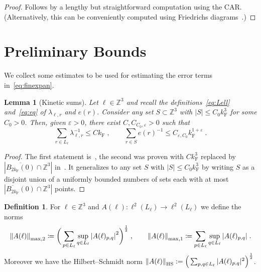 \documentclass[12pt,a4paper]{article}
\numberwithin{equation}{section}
\newcommand{\1}{\mathbb{I}}
\newcommand{\F}{\mathrm{F}}
\newcommand{\HS}{\mathrm{HS}}
\newcommand{\kF}{k_\F}
\newcommand{\Zstar}{\mathbb{Z}^3} %
\newcommand{\Z}{\mathbb{Z}}
\newcommand{\half}{\frac{1}{2}}
\theoremstyle{plain}
\newtheorem{lemma}[theorem]{Lemma}
\theoremstyle{definition}
\newtheorem{definition}[theorem]{Definition}
\theoremstyle{remark}
\theoremstyle{plain}
\theoremstyle{definition}
\theoremstyle{remark}
\begin{document}
\begin{proof}
Follows by a lengthy but straightforward computation using the CAR. (Alternatively, this can be conveniently computed using Friedrichs diagrams~\cite{BL25}.)
\end{proof}


\section{Preliminary Bounds}
\label{sec:prelim_bounds}

We collect some estimates to be used for estimating the error terms in~\eqref{eq:finexpan}.

\begin{lemma}[Kinetic sums] \label{lem:lambdainverse}
Let $ \ell \in \Zstar $ and recall the definitions~\eqref{eq:Lell} and~\eqref{eq:eq} of $ \lambda_{\ell,r} $ and $ e(r) $. Consider any set $ S \subset \Z^3 $ with $ |S| \le C_0 \kF^3 $ for some $ C_0 > 0 $. Then, given $ \varepsilon > 0 $, there exist $ C, C_{C_0, \varepsilon} > 0 $ such that
\begin{equation} \label{eq:lambdainverse}
	\sum_{r \in L_\ell} \lambda_{\ell,r}^{-1} \le C \kF \;, \qquad
	\sum_{r \in S} e(r)^{-1} \le C_{\varepsilon, C_0} \kF^{1+\varepsilon} \;.
\end{equation}
\end{lemma}
\begin{proof}
The first statement is~\cite[Prop.~A.2]{CHN22}, the second was proven with $ C \kF^3 $ replaced by $ |\overline{B_{2 \kF}(0)} \cap \Z^3| $ in~\cite[Lemma~3.2]{CHN24}. It generalizes to any set $S$ with $ |S| \le C_0 \kF^3 $ by writing $ S $ as a disjoint union of a uniformly bounded numbers of sets each with at most $ |\overline{B_{2 \kF}}(0) \cap \Z^3| $ points.
\end{proof}

\begin{definition}
For $ \ell \in \Zstar$ and $A(\ell) : \ell^2(L_\ell) \to \ell^2(L_\ell)$ we define the norms
\begin{equation}
\begin{aligned}
	\norm{A(\ell)}_{\max,2}
	\coloneq \bigg(\sum_{p \in L_\ell}
	\sup\limits_{q \in L_\ell}
	\abs{A(\ell)_{p,q}}^2\bigg)^\half \;, \qquad
	\norm{A(\ell)}_{\mathrm{max,1}}
	\coloneq \sum_{p \in L_\ell}
	\sup\limits_{q \in L_\ell}
	\abs{A(\ell)_{p,q}} \;.
\end{aligned}
\end{equation}
Moreover we have the Hilbert--Schmidt norm $ \norm{A(\ell)}_{\HS} := \Big( \sum_{p,q \in L_\ell} |A(\ell)_{p,q}|^2 \Big)^{\half} $.
\end{definition}
\end{document}
